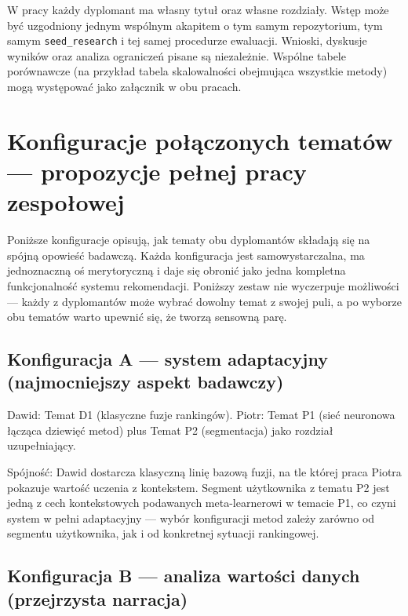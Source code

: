 \documentclass[12pt,a4paper]{article}
\begin{document}
W pracy każdy dyplomant ma własny tytuł oraz własne rozdziały. Wstęp może być uzgodniony jednym wspólnym akapitem o tym samym repozytorium, tym samym \texttt{seed\_research} i tej samej procedurze ewaluacji. Wnioski, dyskusje wyników oraz analiza ograniczeń pisane są niezależnie. Wspólne tabele porównawcze (na przykład tabela skalowalności obejmująca wszystkie metody) mogą występować jako załącznik w obu pracach.


\section{Konfiguracje połączonych tematów --- propozycje pełnej pracy zespołowej}

Poniższe konfiguracje opisują, jak tematy obu dyplomantów składają się na spójną opowieść badawczą. Każda konfiguracja jest samowystarczalna, ma jednoznaczną oś merytoryczną i daje się obronić jako jedna kompletna funkcjonalność systemu rekomendacji. Poniższy zestaw nie wyczerpuje możliwości --- każdy z dyplomantów może wybrać dowolny temat z swojej puli, a po wyborze obu tematów warto upewnić się, że tworzą sensowną parę.

\subsection*{Konfiguracja A --- system adaptacyjny (najmocniejszy aspekt badawczy)}

Dawid: Temat D1 (klasyczne fuzje rankingów). Piotr: Temat P1 (sieć neuronowa łącząca dziewięć metod) plus Temat P2 (segmentacja) jako rozdział uzupełniający.

Spójność: Dawid dostarcza klasyczną linię bazową fuzji, na tle której praca Piotra pokazuje wartość uczenia z kontekstem. Segment użytkownika z tematu P2 jest jedną z cech kontekstowych podawanych meta-learnerowi w temacie P1, co czyni system w pełni adaptacyjny --- wybór konfiguracji metod zależy zarówno od segmentu użytkownika, jak i od konkretnej sytuacji rankingowej.

\subsection*{Konfiguracja B --- analiza wartości danych (przejrzysta narracja)}
\end{document}
